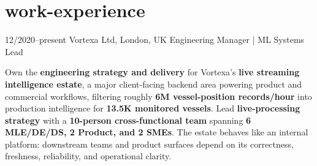 \documentclass[]{../../friggeri-cv}
\begin{document}
\section{work-experience}
\begin{entrylist}
    \entry
    {12/2020--present}
    {Vortexa Ltd, London, UK}
    {Engineering Manager | ML Systems Lead}
    {
        {\small
        \setlength{\parindent}{0pt}
        \setlength{\leftskip}{0pt}
        Own the \textbf{engineering strategy and delivery} for Vortexa's \textbf{live streaming intelligence estate}, a major client-facing backend area powering product and commercial workflows, filtering roughly \textbf{6M vessel-position records/hour} into production intelligence for \textbf{13.5K monitored vessels}. Lead \textbf{live-processing strategy} with a \textbf{10-person cross-functional team} spanning \textbf{6 MLE/DE/DS, 2 Product, and 2 SMEs}. The estate behaves like an internal platform: downstream teams and product surfaces depend on its correctness, freshness, reliability, and operational clarity.

}}
\end{entrylist}
\end{document}
